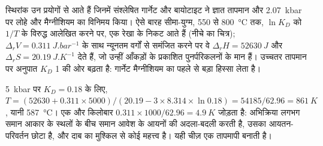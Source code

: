 स्थिरांक उन प्रयोगों से आते हैं जिनमें संश्लेषित गार्नेट और बायोटाइट ने ज्ञात तापमान और \qty{2.07}{kbar} पर
लोहे और मैग्नीशियम का विनिमय किया। ऐसे बारह सीमा-युग्म, 550 से
\qty{800}{\celsius} तक, $\ln K_D$ को $1/T$ के विरुद्ध आलेखित करने पर, एक रेखा के निकट आते हैं (नीचे का
चित्र); $\Delta_r V = \qty{0.311}{J.bar^{-1}}$ के साथ न्यूनतम वर्गों से समंजित करने पर वे
$\Delta_r H = \qty{52630}{J}$ और $\Delta_r S = \qty{20.19}{J.K^{-1}}$ देते हैं, जो उन्हीं आँकड़ों के
प्रकाशित पुनर्परिकलनों के मान हैं। उच्चतर तापमान पर अनुपात $K_D$ 1 की ओर
बढ़ता है: गार्नेट मैग्नीशियम का पहले से बड़ा हिस्सा लेता है।

\begin{omfigure}
\centering
{}
\par{}
\end{omfigure}

\qty{5}{kbar} पर $K_D = 0.18$ के लिए, $T = (52630 + 0.311\times5000)/(20.19 - 3\times8.314
\times\ln 0.18) = 54185/62.96 = \qty{861}{K}$, यानी \qty{587}{\celsius}। एक और किलोबार
$0.311\times1000/62.96 = \qty{4.9}{K}$ जोड़ता है: अभिक्रिया लगभग समान आकार के स्थलों के बीच
समान आवेश के आयनों की अदला-बदली करती है, उसका आयतन-परिवर्तन छोटा है, और दाब का
मुश्किल से कोई महत्त्व है। यही चीज़ एक तापमापी बनाती है।

